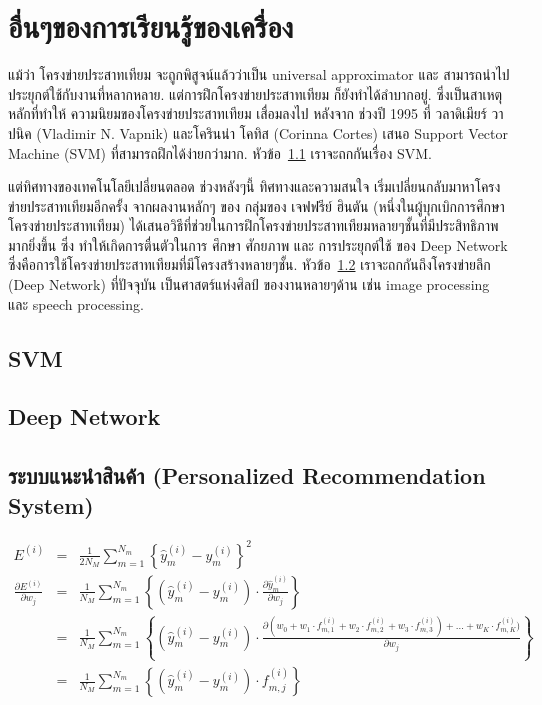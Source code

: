 \chapter{อื่นๆของการเรียนรู้ของเครื่อง}
\label{chapter: others}

แม้ว่า โครงข่ายประสาทเทียม จะถูกพิสูจน์แล้วว่าเป็น universal approximator และ สามารถนำไปประยุกต์ใช้กับงานที่หลากหลาย.
แต่การฝึกโครงข่ายประสาทเทียม ก็ยังทำได้ลำบากอยู่.
ซึ่งเป็นสาเหตุหลักที่ทำให้ ความนิยมของโครงข่ายประสาทเทียม เสื่อมลงไป หลังจาก ช่วงปี 1995 ที่ วลาดิเมียร์ วาปนิค (Vladimir N. Vapnik) และโครินน่า โคทิส (Corinna Cortes) เสนอ Support Vector Machine (SVM) \cite{CortesVapnik1995a} ที่สามารถฝึกได้ง่ายกว่ามาก.
หัวข้อ~\ref{sec: SVM} เราจะถกกันเรื่อง SVM.

แต่ทิศทางของเทคโนโลยีเปลี่ยนตลอด 
ช่วงหลังๆนี้ ทิศทางและความสนใจ เริ่มเปลี่ยนกลับมาหาโครงข่ายประสาทเทียมอีกครั้ง จากผลงานหลักๆ ของ กลุ่มของ เจฟฟรีย์ ฮินตัน (หนึ่งในผู้บุกเบิกการศึกษาโครงข่ายประสาทเทียม) ได้เสนอวิธีที่ช่วยในการฝึกโครงข่ายประสาทเทียมหลายๆชั้นที่มีประสิทธิภาพมากยิ่งขึ้น \cite{HintonSalakhutdinov2006a, HintonEtAl2006a} ซึ่ง ทำให้เกิดการตื่นตัวในการ ศึกษา ศักยภาพ และ การประยุกต์ใช้ ของ Deep Network ซึ่งคือการใช้โครงข่ายประสาทเทียมที่มีโครงสร้างหลายๆชั้น.
หัวข้อ~\ref{sec: Deep Network} เราจะถกกันถึงโครงข่ายลึก (Deep Network) ที่ปัจจุบัน เป็นศาสตร์แห่งศิลป์ ของงานหลายๆด้าน เช่น image processing และ speech processing.

\section{SVM}
\label{sec: SVM}

\section{Deep Network}
\label{sec: Deep Network}

\section{ระบบแนะนำสินค้า (Personalized Recommendation System)}

\begin{eqnarray}
E^{(i)} &=& \frac{1}{2 N_M} \sum_{m=1}^{N_m} 
\left\{ 
  \hat{y}^{(i)}_m - y^{(i)}_m
\right\}^2
\nonumber 
\\
\frac{\partial E^{(i)}}{\partial w_j} &=& \frac{1}{N_M} \sum_{m=1}^{N_m} 
\left\{ 
  (\hat{y}^{(i)}_m - y^{(i)}_m) \cdot \frac{\partial \hat{y}^{(i)}_m}{\partial w_j}
\right\}
\nonumber 
\\
&=& \frac{1}{N_M} \sum_{m=1}^{N_m} 
\left\{ 
  (\hat{y}^{(i)}_m - y^{(i)}_m) \cdot \frac{\partial (w_0 + w_1 \cdot f_{m,1}^{(i)} + w_2 \cdot f_{m,2}^{(i)} + w_3 \cdot f_{m,3}^{(i)}) + \ldots + w_K \cdot f_{m,K}^{(i)})}{\partial w_j}
\right\}
\nonumber \\
&=& \frac{1}{N_M} \sum_{m=1}^{N_m} 
\left\{ 
  (\hat{y}^{(i)}_m - y^{(i)}_m) \cdot f_{m,j}^{(i)}
\right\}
\end{eqnarray}


